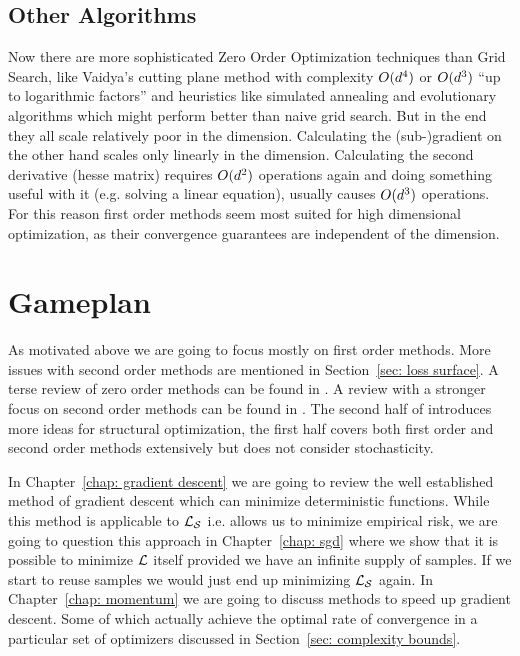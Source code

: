 \subsection{Other Algorithms}

Now there are more sophisticated Zero Order Optimization techniques than Grid
Search, like Vaidya's cutting plane method
\parencite[e.g.][]{bubeckConvexOptimizationAlgorithms2015} with complexity
\(O(d^4)\) or \(O(d^3)\) ``up to logarithmic factors''
\parencite[Section 2.3]{bubeckConvexOptimizationAlgorithms2015} and heuristics
like simulated annealing and evolutionary algorithms which might perform better
than naive grid search. But in the end they all scale relatively poor in the
dimension. Calculating the \mbox{(sub-)gradient} on the other hand scales only
linearly in the dimension. Calculating the second derivative (hesse matrix)
requires \(O(d^2)\) operations again and doing something useful with it
(e.g. solving a linear equation), usually causes \(O(d^3)\)
operations. For this reason first order methods seem most suited for high
dimensional optimization, as their convergence guarantees are independent of
the dimension.

\section{Gameplan}

As motivated above we are going to focus mostly on first order methods. More
issues with second order methods are mentioned in Section~\ref{sec: loss
surface}. A terse review of zero order methods can be found in
\textcite{bubeckConvexOptimizationAlgorithms2015}. A review with a stronger
focus on second order methods can be found in
\textcite{bottouOptimizationMethodsLargeScale2018}. The second half of
\textcite{nesterovLecturesConvexOptimization2018} introduces more ideas for
structural optimization, the first half covers both first order and second
order methods extensively but does not consider stochasticity.

In Chapter~\ref{chap: gradient descent} we are going to review the well
established method of gradient descent which can minimize deterministic
functions. While this method is applicable to \(\mathcal{L}_{\mathcal{S}}\) i.e. allows us to
minimize empirical risk, we are going to question this approach in
Chapter~\ref{chap: sgd} where we show that it is possible to minimize \(\mathcal{L}\)
itself provided we have an infinite supply of samples. If we start to reuse
samples we would just end up minimizing \(\mathcal{L}_{\mathcal{S}}\) again. In
Chapter~\ref{chap: momentum} we are going to discuss methods to speed up
gradient descent. Some of which actually achieve the optimal rate of convergence
in a particular set of optimizers discussed in Section~\ref{sec:
complexity bounds}.



\endinput
